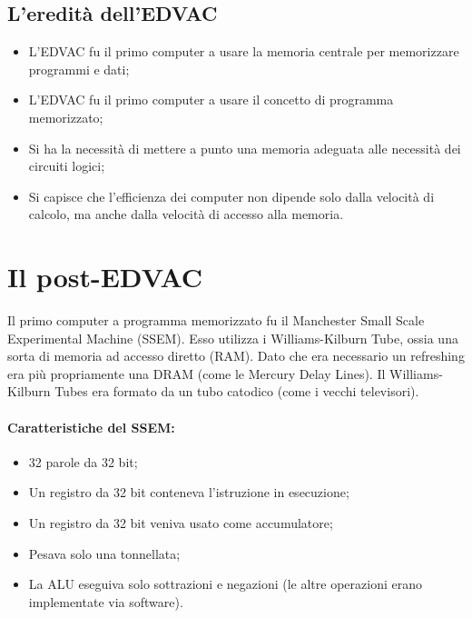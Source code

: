 
\subsection{L'eredità dell'EDVAC}

\begin{itemize}
    \item L'EDVAC fu il primo computer a usare la memoria centrale per memorizzare 
    programmi e dati;
    \item L'EDVAC fu il primo computer a usare il concetto di programma memorizzato;
    \item Si ha la necessità di  mettere a punto una memoria adeguata alle necessità dei
    circuiti logici;
    \item Si capisce che l'efficienza dei computer non dipende solo dalla velocità di
    calcolo, ma anche dalla velocità di accesso alla memoria.
\end{itemize}

\section{Il post-EDVAC}

Il primo computer a programma memorizzato fu il Manchester Small Scale Experimental Machine (SSEM).
Esso utilizza i Williams-Kilburn Tube, ossia una sorta di memoria ad accesso diretto (RAM).
Dato che era necessario un refreshing era più propriamente una DRAM (come le Mercury Delay Lines).
Il Williams-Kilburn Tubes era formato da un tubo catodico (come i vecchi televisori).

\paragraph{Caratteristiche del SSEM:}

\begin{itemize}
    \item 32 parole da 32 bit;
    \item Un registro da 32 bit conteneva l'istruzione in esecuzione;
    \item Un registro da 32 bit veniva usato come accumulatore;
    \item Pesava solo una tonnellata;
    \item La ALU eseguiva solo sottrazioni e negazioni (le altre operazioni erano implementate via software).
\end{itemize}

